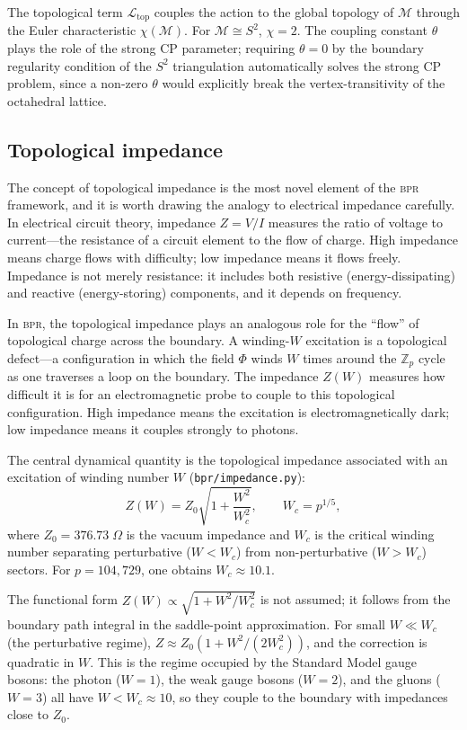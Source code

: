 \documentclass[aps,prd,twocolumn,superscriptaddress,longbibliography,nofootinbib]{revtex4-2}
\newcommand{\Zp}{\mathbb{Z}_p}
\newcommand{\Stwo}{S^2}
\newcommand{\Wc}{W_{\!c}}
\newcommand{\Zimp}{Z}
\newcommand{\Zvac}{Z_0}
\newcommand{\bpr}{\textsc{bpr}}
\begin{document}
The topological term $\mathcal{L}_{\mathrm{top}}$ couples the action
to the global topology of $\mathcal{M}$ through the Euler
characteristic $\chi(\mathcal{M})$.  For $\mathcal{M} \cong \Stwo$,
$\chi = 2$.  The coupling constant $\theta$ plays the role of the
strong CP parameter; requiring $\theta = 0$ by the boundary
regularity condition of the $\Stwo$ triangulation automatically
solves the strong CP problem, since a non-zero $\theta$ would
explicitly break the vertex-transitivity of the octahedral lattice.

\subsection{Topological impedance}

The concept of topological impedance is the most novel element of the
\bpr{} framework, and it is worth drawing the analogy to electrical
impedance carefully.  In electrical circuit theory, impedance
$Z = V/I$ measures the ratio of voltage to current---the resistance
of a circuit element to the flow of charge.  High impedance means
charge flows with difficulty; low impedance means it flows freely.
Impedance is not merely resistance: it includes both resistive
(energy-dissipating) and reactive (energy-storing) components, and
it depends on frequency.

In \bpr{}, the topological impedance plays an analogous role for the
``flow'' of topological charge across the boundary.  A winding-$W$
excitation is a topological defect---a configuration in which the
field $\Phi$ winds $W$ times around the $\Zp$ cycle as one traverses
a loop on the boundary.  The impedance $\Zimp(W)$ measures how
difficult it is for an electromagnetic probe to couple to this
topological configuration.  High impedance means the excitation is
electromagnetically dark; low impedance means it couples strongly to
photons.

The central dynamical quantity is the topological impedance
associated with an excitation of winding number $W$
(\texttt{bpr/impedance.py}):
\begin{equation}
\Zimp(W) = \Zvac \sqrt{1 + \frac{W^2}{\Wc^2}},
\qquad \Wc = p^{1/5},
\label{eq:impedance}
\end{equation}
where $\Zvac = 376.73\;\Omega$ is the vacuum impedance and
$\Wc$ is the critical winding number separating perturbative
($W < \Wc$) from non-perturbative ($W > \Wc$) sectors.  For
$p = 104{,}729$, one obtains $\Wc \approx 10.1$.

The functional form $\Zimp(W) \propto \sqrt{1 + W^2/\Wc^2}$ is not
assumed; it follows from the boundary path integral in the
saddle-point approximation.  For small $W \ll \Wc$ (the perturbative
regime), $\Zimp \approx \Zvac(1 + W^2/(2\Wc^2))$, and the correction
is quadratic in $W$.  This is the regime occupied by the Standard
Model gauge bosons: the photon ($W = 1$), the weak gauge bosons
($W = 2$), and the gluons ($W = 3$) all have $W < \Wc \approx 10$,
so they couple to the boundary with impedances close to $\Zvac$.
\end{document}
